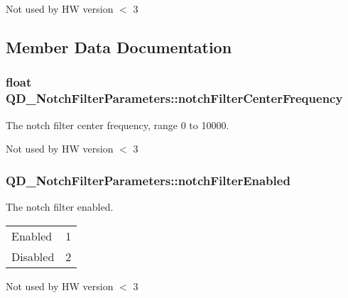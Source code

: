 Not used by HW version $<$ 3

\subsection{Member Data Documentation}
\subsubsection[{\texorpdfstring{notch\+Filter\+Center\+Frequency}{notchFilterCenterFrequency}}]{\setlength{\rightskip}{0pt plus 5cm}float Q\+D\+\_\+\+Notch\+Filter\+Parameters\+::notch\+Filter\+Center\+Frequency}\hypertarget{struct_q_d___notch_filter_parameters_a0c9b3a2b354bbd78e5572e9b4a1ae8d7}{}\label{struct_q_d___notch_filter_parameters_a0c9b3a2b354bbd78e5572e9b4a1ae8d7}


The notch filter center frequency, range 0 to 10000. 

Not used by HW version $<$ 3
\subsubsection[{\texorpdfstring{notch\+Filter\+Enabled}{notchFilterEnabled}}]{ Q\+D\+\_\+\+Notch\+Filter\+Parameters\+::notch\+Filter\+Enabled}\hypertarget{struct_q_d___notch_filter_parameters_adaa95114b057710c70f69e36d6b4534f}{}\label{struct_q_d___notch_filter_parameters_adaa95114b057710c70f69e36d6b4534f}


The notch filter enabled. \tabulinesep=1mm
\begin{longtabu} spread 0pt [c]{*2{|X[-1]}|}
\hline
Enabled&1 \\
Disabled&2 \\
\end{longtabu}


Not used by HW version $<$ 3
